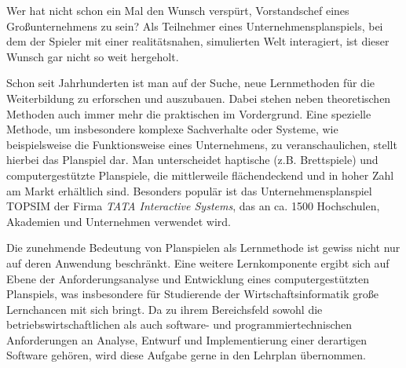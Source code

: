 
Wer hat nicht schon ein Mal den Wunsch verspürt, Vorstandschef eines Großunternehmens zu sein? 
Als Teilnehmer eines Unternehmensplanspiels, bei dem der Spieler mit  einer realitätsnahen, simulierten Welt interagiert, ist dieser Wunsch gar nicht so weit hergeholt. 

Schon seit Jahrhunderten ist man auf der Suche, neue Lernmethoden für die Weiterbildung zu erforschen und auszubauen. Dabei stehen neben theoretischen Methoden auch immer mehr die praktischen im Vordergrund.  Eine spezielle Methode, um insbesondere komplexe Sachverhalte oder Systeme, wie beispielsweise die Funktionsweise eines Unternehmens, zu veranschaulichen, stellt hierbei das Planspiel dar. Man unterscheidet haptische (z.B. Brettspiele) und computergestützte Planspiele, die mittlerweile flächendeckend und in hoher Zahl am Markt erhältlich sind. Besonders populär ist das Unternehmensplanspiel TOPSIM der Firma \textit{TATA Interactive Systems}, das an ca. 1500 Hochschulen, Akademien und Unternehmen verwendet wird. 

Die zunehmende Bedeutung von Planspielen als Lernmethode ist gewiss nicht nur auf deren Anwendung beschränkt. Eine weitere Lernkomponente ergibt sich auf Ebene der Anforderungsanalyse und Entwicklung eines computergestützten Planspiels, was insbesondere für Studierende der Wirtschaftsinformatik große Lernchancen mit sich bringt. Da zu ihrem Bereichsfeld sowohl die betriebswirtschaftlichen als auch software- und programmiertechnischen Anforderungen an Analyse, Entwurf und Implementierung einer derartigen Software gehören, wird diese Aufgabe gerne in den Lehrplan übernommen.

\autorende{}